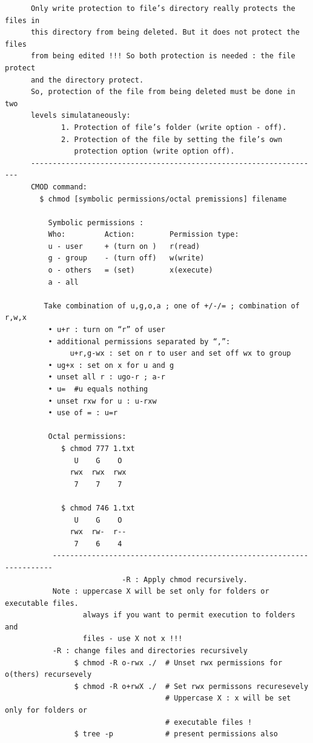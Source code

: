 \documentclass[a4paper,12pt]{article}
\begin{document}
\begin{verbatim}
      Only write protection to file’s directory really protects the files in    
      this directory from being deleted. But it does not protect the files 
      from being edited !!! So both protection is needed : the file protect 
      and the directory protect. 
      So, protection of the file from being deleted must be done in two
      levels simulataneously: 
             1. Protection of file’s folder (write option - off). 
             2. Protection of the file by setting the file’s own
                protection option (write option off).
	  -------------------------------------------------------------------	
      CMOD command:
        $ chmod [symbolic permissions/octal premissions] filename
          
          Symbolic permissions : 
          Who:         Action:        Permission type:
          u - user     + (turn on )   r(read)
          g - group    - (turn off)   w(write)
          o - others   = (set)        x(execute)
          a - all

         Take combination of u,g,o,a ; one of +/-/= ; combination of r,w,x
          • u+r : turn on “r” of user
          • additional permissions separated by “,”:
               u+r,g-wx : set on r to user and set off wx to group
          • ug+x : set on x for u and g
          • unset all r : ugo-r ; a-r
          • u=  #u equals nothing
          • unset rxw for u : u-rxw
          • use of = : u=r
	      
          Octal permissions:
             $ chmod 777 1.txt
                U    G    O 
               rwx  rwx  rwx
                7    7    7
           	 
           	 $ chmod 746 1.txt          
                U    G    O 
               rwx  rw-  r--
                7    6    4
           ----------------------------------------------------------------------
                           -R : Apply chmod recursively.
           Note : uppercase X will be set only for folders or executable files.
                  always if you want to permit execution to folders and 
                  files - use X not x !!!   
           -R : ﻿change files and directories recursively
                $ chmod -R o-rwx ./  # Unset rwx permissions for o(thers) recursevely
                $ chmod -R o+rwX ./  # Set rwx permissons recuresevely 
                                     # Uppercase X : x will be set only for folders or  
                                     # executable files ! 
                $ tree -p            # present permissions also                     
           

\end{verbatim}
\end{document}
